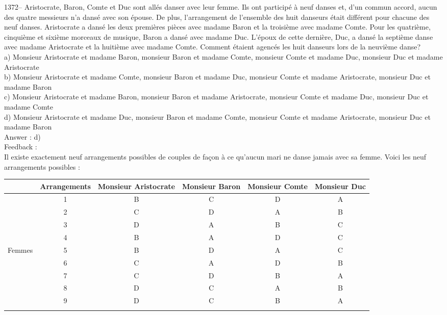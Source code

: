 ﻿\documentclass[letterpaper, 12pt]{article}
\begin{document}
1372-- Aristocrate, Baron, Comte et Duc sont all\'es danser avec
leur femme. Ils ont particip\'e \`a neuf danses et, d'un commun
accord, aucun des quatre messieurs n'a dans\'e avec son \'epouse. De
plus, l'arrangement de l'ensemble des huit danseurs \'etait
diff\'erent pour chacune des neuf danses. Aristocrate a dans\'e les
deux premi\`eres pi\`eces avec madame Baron et la troisi\`eme avec
madame Comte. Pour les quatri\`eme, cinqui\`eme et sixi\`eme
morceaux de musique, Baron a dans\'e avec madame Duc.  L'\'epoux de
cette derni\`ere, Duc, a dans\'e la septi\`eme danse avec madame
Aristocrate et la huiti\`eme avec madame Comte.
Comment \'etaient agenc\'es les huit danseurs lors de la neuvi\`eme danse?\\
a) Monsieur Aristocrate et madame Baron, monsieur Baron et madame Comte,
monsieur Comte et madame Duc, monsieur Duc et madame Aristocrate\\
b) Monsieur Aristocrate et madame Comte, monsieur Baron et madame Duc,
monsieur Comte et madame Aristocrate, monsieur Duc et madame Baron\\
c) Monsieur Aristocrate et madame Baron, monsieur Baron et madame
Aristocrate, monsieur Comte et madame Duc, monsieur Duc et madame Comte\\
d) Monsieur Aristocrate et madame Duc, monsieur Baron et madame Comte,
monsieur Comte et madame Aristocrate, monsieur Duc et madame Baron\\

Answer : d)\\

Feedback : \\
Il existe exactement neuf arrangements possibles de couples de fa\c con \`a
ce qu'aucun mari ne danse jamais avec sa femme.  Voici les neuf arrangements
possibles :  \\
\begin{tabular}{|c|c|c|c|c|c|}
\hline
        &  Arrangements   & Monsieur Aristocrate & Monsieur Baron & Monsieur
Comte & Monsieur Duc    \\ \hline \hline
        &   1             & B           & C     & D      & A      \\
\cline{2-6}
        &   2             & C           & D     & A      & B      \\
\cline{2-6}
        &   3             & D           & A     & B      & C      \\
\cline{2-6}
        &   4             & B           & A     & D      & C      \\
\cline{2-6}
Femmes  &   5             & B           & D     & A      & C      \\
\cline{2-6}
        &   6             & C           & A     & D      & B      \\
\cline{2-6}
        &   7             & C           & D     & B      & A      \\
\cline{2-6}
        &   8             & D           & C     & A      & B      \\
\cline{2-6}
        &   9             & D           & C     & B      & A      \\ \hline
\multicolumn{6}{c}{}\\
\end{tabular}\\
\end{document}
